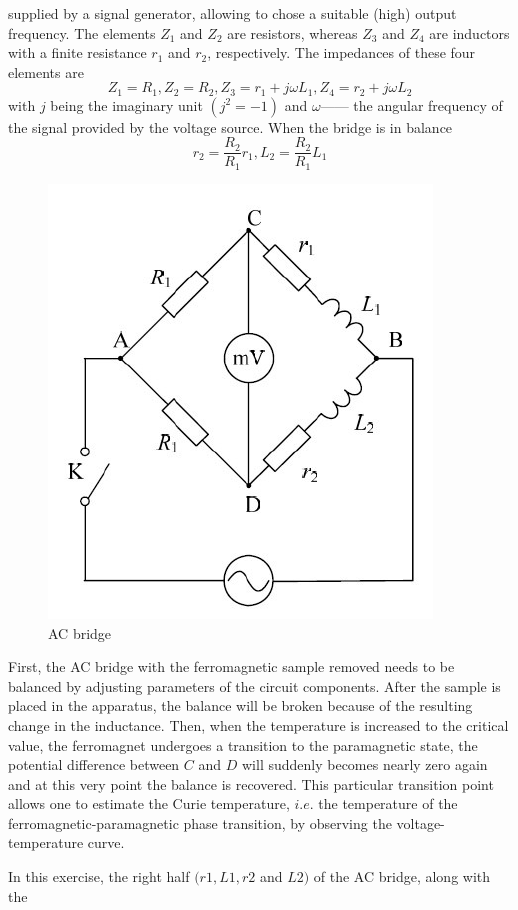 \documentclass[12pt]{article}
\begin{document}
supplied by a signal generator, allowing to chose a suitable (high) output frequency. The
elements $Z_1$ and $Z_2$ are resistors, whereas $Z_3$ and $Z_4$ are inductors with a finite resistance $r_1$ and $r_2$, respectively. The impedances of these four elements are
$$Z_1=R_1,Z_2=R_2,Z_3=r_1+j\omega L_1,Z_4=r_2+j\omega L_2$$
with $j$ being the imaginary unit $(j^2=-1)$ and $\omega——$ the angular frequency of the signal
provided by the voltage source. When the bridge is in balance $$r_2=\frac{R_2}{R_1}r_1,L_2=\frac{R_2}{R_1}L_1$$
\begin{figure}[H]
\centering
\includegraphics[scale=0.5]{P5.jpg}
\caption{AC bridge}
\end{figure}
First, the AC bridge with the ferromagnetic sample removed needs to be balanced by
adjusting parameters of the circuit components. After the sample is placed in the apparatus, the balance will be broken because of the resulting change in the inductance. Then,
when the temperature is increased to the critical value, the ferromagnet undergoes a transition to the paramagnetic state, the potential difference between $C$ and $D$ will suddenly
becomes nearly zero again and at this very point the balance is recovered. This particular
transition point allows one to estimate the Curie temperature, $i.e$. the temperature of
the ferromagnetic-paramagnetic phase transition, by observing the voltage-temperature
curve.
\par In this exercise, the right half $(r1, L1, r2$ and $L2)$ of the AC bridge, along with the
\end{document}
